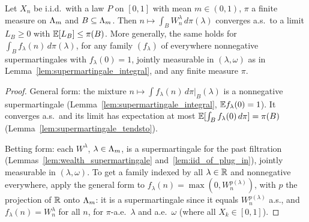 \begin{lemma}
  \label{lem:mixture_small}
  \leanok
  Let $X_n$ be i.i.d.\ with a law $P$ on $[0,1]$ with mean $m \in (0,1)$, $\pi$ a finite measure on
  $\Lambda_m$ and $B \subseteq \Lambda_m$. Then $n \mapsto \int_B W^\lambda_n \, d\pi(\lambda)$ converges a.s.\
  to a limit $L_B \ge 0$ with $\mathbb{E}[L_B] \le \pi(B)$. More generally, the same holds for
  $\int_B f_\lambda(n) \, d\pi(\lambda)$, for any family $(f_\lambda)$ of everywhere nonnegative
  supermartingales with $f_\lambda(0) = 1$, jointly measurable in $(\lambda, \omega)$ as in
  Lemma~\ref{lem:supermartingale_integral}, and any finite measure $\pi$.
\end{lemma}

\begin{proof}
  \leanok
  General form: the mixture $n \mapsto \int f_\lambda(n) \, d\pi|_B(\lambda)$ is a nonnegative
  supermartingale (Lemma~\ref{lem:supermartingale_integral}, $\mathbb{E} f_\lambda(0) = 1$). It converges
  a.s.\ and its limit has expectation at most $\mathbb{E}[\int_B f_\lambda(0) \, d\pi] = \pi(B)$
  (Lemma~\ref{lem:supermartingale_tendsto}).

  Betting form: each $W^\lambda$, $\lambda \in \Lambda_m$, is a supermartingale for the past filtration
  (Lemmas~\ref{lem:wealth_supermartingale} and~\ref{lem:iid_of_plug_in}), jointly measurable in
  $(\lambda, \omega)$. To get a family indexed by all $\lambda \in \mathbb{R}$ and nonnegative everywhere,
  apply the general form to $f_\lambda(n) = \max(0, W^{p(\lambda)}_n)$, with $p$ the projection of
  $\mathbb{R}$ onto $\Lambda_m$: it is a supermartingale since it equals $W^{p(\lambda)}_n$ a.s., and
  $f_\lambda(n) = W^\lambda_n$ for all $n$, for $\pi$-a.e.\ $\lambda$ and a.e.\ $\omega$ (where all
  $X_k \in [0,1]$).
\end{proof}

